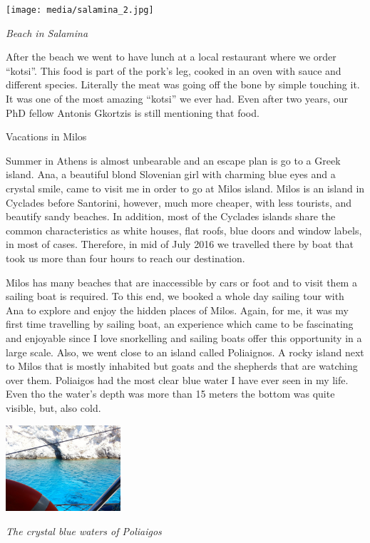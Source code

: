 \documentclass[10pt,a4paper]{article} %
\newcommand{\NewsItem}[1]{ %
\usefont{T1}{fvs}{n}{n} %
\vspace{24pt}\large #1\vspace{3pt} %
\par \normalsize \normalfont}
\begin{document}
\begin{multicols}{3}
\begin{center}
	\texttt{[image: media/salamina\_2.jpg]}
	\par\textit{Beach in Salamina}
\end{center}


After the beach we went to have lunch at a local restaurant where we order ``kotsi''. 
This food is part of the pork's leg, cooked in an oven with sauce and different 
species. 
Literally the meat was going off the bone by simple touching it. 
It was one of the most amazing ``kotsi'' we ever had. 
Even after two years, our PhD fellow Antonis Gkortzis is still mentioning that food.     


\NewsItem{Vacations in Milos}

Summer in Athens is almost unbearable and an escape plan is go to a Greek island. 
Ana, a beautiful blond Slovenian girl with charming blue eyes 
and a crystal smile, came to visit me in order to go at Milos island. 
Milos is an island in Cyclades before Santorini, however, much more 
cheaper, with less tourists, and beautify sandy beaches. 
In addition, most of the Cyclades islands share the common characteristics as 
white houses, flat roofs, blue doors and window labels, in most of cases. 
Therefore, in mid of July 2016 we travelled there by boat that took us more than four hours to reach 
our destination. 


Milos has many beaches that are inaccessible by cars or foot and to visit them 
a sailing boat is required. 
To this end, we booked a whole day sailing tour with Ana to explore and enjoy 
the hidden places of Milos. 
Again, for me, it was my first time travelling by sailing boat, an  experience 
which came to be fascinating and enjoyable since I love snorkelling and sailing 
boats offer this opportunity in a large scale. 
Also, we went close to an island called Poliaignos. 
A rocky island next to Milos that is mostly inhabited but goats and the 
shepherds that are watching over them.
Poliaigos had the most clear blue water I have ever seen in my life. 
Even tho the water's depth was more than 15 meters the bottom was quite 
visible, but, also cold.

\begin{center}
	\includegraphics[width=0.32\textwidth]{media/milos_poliaigos.jpg}
	\par\textit{The crystal blue waters of Poliaigos}
\end{center}
  


\end{multicols}
\end{document}
